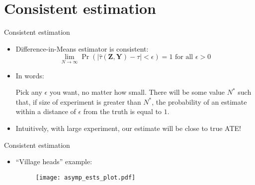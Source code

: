 \documentclass[table, xcolor = {dvipsnames}, 9pt]{beamer}
\theoremstyle{plain}
\begin{document}
\section{Consistent estimation}
\begin{frame}{Consistent estimation}
\vfill
\begin{itemize} \vfill
\item Difference-in-Means estimator is consistent: \pause \vfill
\begin{equation*}
\lim \limits_{N \to \infty} \Pr\left(\left\lvert \hat{\tau}\left(\bm{Z}, \bm{Y}\right) - \tau \right\rvert < \epsilon \right) = 1 \text{ for all } \epsilon > 0
\end{equation*} \pause \vfill
\item In words: \vfill
\begin{center}
Pick any $\epsilon$ you want, no matter how small. There will be some value $N^{*}$ such that, if size of experiment is greater than $N^*$,
the probability of an estimate within a distance of $\epsilon$ from the truth is equal to $1$.
\end{center} \pause \vfill
\item Intuitively, with large experiment, our estimate will be close to true ATE! \vfill
\end{itemize}
\vfill
\end{frame}
\begin{frame}{Consistent estimation}
\vfill
\begin{itemize} \vfill
\item ``Village heads'' example: \vfill
\begin{figure}[H]
\texttt{[image: asymp\_ests\_plot.pdf]}
\end{figure}
\end{itemize}
\vfill
\end{frame}
\end{document}
